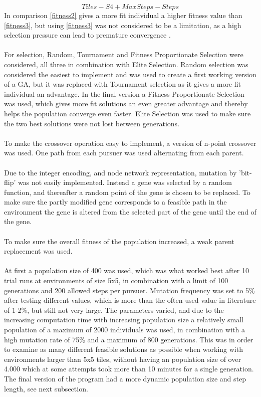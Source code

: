 %
\begin{equation} \label{fitness3}Tiles-S4+MaxSteps-Steps \end{equation}
%
In comparison \eqref{fitness2} gives a more fit individual a higher fitness value than \eqref{fitness3}, but using \eqref{fitness3} was not considered to be a limitation, as a high selection pressure can lead to premature convergence \cite{GAHandbook1}.\\\\ %
For selection, Random, Tournament  and Fitness Proportionate Selection were considered, all three in combination with Elite Selection. Random selection was considered the easiest to implement and was used to create a first working version of a GA, but it was replaced with Tournament selection as it gives a more fit individual an advantage. In the final version a Fitness Proportionate Selection was used, which gives more fit solutions an even greater advantage and thereby helps the population converge even faster. Elite Selection was used to make sure the two best solutions were not lost between generations.\\\\
To make the crossover operation easy to implement, a version of n-point crossover was used. One path from each pursuer was used alternating from each parent.\\\\
Due to the integer encoding, and node network representation, mutation by 'bit-flip' was not easily implemented. Instead a gene was selected by a random function, and thereafter a random point of the gene is chosen to be replaced. To make sure the partly modified gene corresponds to a feasible path in the environment the gene is altered from the selected part of the gene until the end of the gene.\\\\
To make sure the overall fitness of the population increased, a weak parent replacement was used.\\\\
At first a population size of 400 was used, which was what worked best after 10 trial runs at environments of size 5x5, in combination with a limit of 100 generations and 200 allowed steps per pursuer. Mutation frequency was set to 5\% after testing different values, which is more than the often used value in literature \cite{GAHandbook2} of 1-2\%, but still not very large. The parameters varied, and due to the increasing computation time with increasing population size a relatively small population of a maximum of 2000 individuals %
was used, in combination with a high mutation rate of 75\% and a maximum of 800 generations. This was in order to examine as many different feasible solutions as possible when working with environments larger than 5x5 tiles, without having an population size of over 4.000 which at some attempts took more than 10 minutes for a single generation. The final version of the program had a more dynamic population size and step length, see next subsection.
